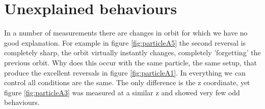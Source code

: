 \section{Unexplained behaviours}
In a number of measurements there are changes in orbit for which we have no good explanation. For example in figure \ref{fig:particleA5} the second reversal is completely sharp, the orbit virtually instantly changes, completely 'forgetting' the previous orbit. Why does this occur with the same particle, the same setup, that produce the excellent reversals in figure \ref{fig:particleA1}. In everything we can control all conditions are the same. The only difference is the z coordinate, yet figure \ref{fig:particleA3} was measured at a similar z and showed very few odd behaviours. 

